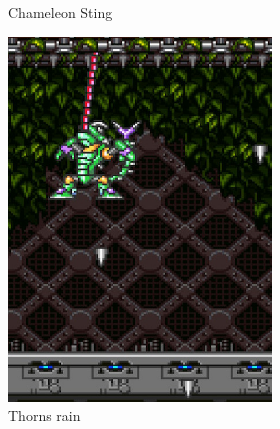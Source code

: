 \begin{figure}[htp]
\begin{figure}[htp]
\begin{subfigure}[t]{0.32\linewidth}
		\caption{Chameleon Sting}
	\end{subfigure}
	\begin{subfigure}[t]{0.26\linewidth}
		\centering
		\includegraphics[width=\linewidth]{figures/X1/Sting_chameleon/Chameleon_spike_fall.jpg}
		\caption{Thorns rain}
	\end{subfigure}
	\begin{subfigure}[t]{0.27\linewidth}
		\centering

\end{subfigure}
\end{figure}
\end{figure}
